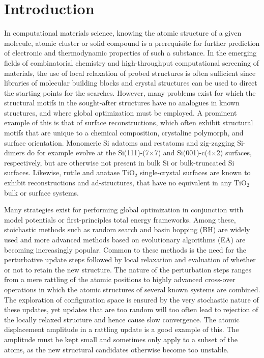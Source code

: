 \documentclass[aip,amsmath,amssymb,reprint]{revtex4-1}
\begin{document}
\section{\label{sec:introduction}Introduction}
In computational materials science, knowing the atomic structure of a
given molecule, atomic cluster or solid compound is a prerequisite for
further prediction of electronic and thermodynamic properties of such
a substance. In the emerging fields of combinatorial chemistry and
high-throughput computational screening of materials,\cite{curtarolo2013} the use of local
relaxation of probed structures is often sufficient since libraries of
molecular building blocks and crystal structures can be used to direct
the starting points for the searches.\cite{hafner2006} However, many problems exist for
which the structural motifs in the sought-after structures have no
analogues in known structures, and where global optimization must be
employed. A prominent example of this is that of surface reconstructions,
which often exhibit structural motifs that are unique to a chemical
composition, crystaline polymorph, and surface orientation. Monomeric
Si adatoms and restatoms and zig-zagging Si-dimers do for example evolve at the
Si(111)-(7$\times$7) and Si(001)-c(4$\times$2) surfaces,\cite{si7x7,si4x2} respectively, but
are otherwise not present in bulk Si or bulk-truncated Si surfaces. Likewise,
rutile and anatase TiO$_2$ single-crystal surfaces are known to exhibit
reconstructions and ad-structures,\cite{anatase1,anatase2,rutile1,rutile2} that have no equivalent in any TiO$_2$ bulk or surface systems.

Many strategies exist for performing global optimization in
conjunction with model potentials or first-principles total energy
frameworks. Among these, stoichastic methods such as random search\cite{pickard2011} and
basin hopping (BH)\cite{wales1997} are widely used and more advanced methods based on
evolutionary algorithms (EA) are becoming increasingly popular.\cite{johnston2003,Oganov2006,Bhattacharya2013} Common
to these methods is the need for the perturbative update steps
followed by local relaxation and evaluation of whether or not to
retain the new structure. The nature of the perturbation steps ranges
from a mere rattling of the atomic positions to highly advanced
cross-over operations in which the atomic structures of several known
systems are combined.\cite{ho1995} The exploration of configuration space is
ensured by the very stochastic nature of these updates,\cite{mathias2018} yet updates
that are too random will too often lead to rejection of the locally
relaxed structure and hence cause slow convergence. The atomic
displacement amplitude in a rattling update is a good example of
this. The amplitude must be kept small and sometimes only apply to a
subset of the atoms, as the new structural candidates otherwise become
too unstable.
\end{document}
